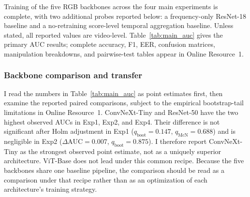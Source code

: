 Training of the five RGB backbones across the four main experiments is complete, with two additional probes reported below: a frequency-only ResNet-18 baseline and a no-retraining score-level temporal aggregation baseline. Unless stated, all reported values are video-level. Table~\ref{tab:main_auc} gives the primary AUC results; complete accuracy, F1, EER, confusion matrices, manipulation breakdowns, and pairwise-test tables appear in Online Resource~1.

\begin{table}[!t]
\caption{Video-level AUC with 95\% bootstrap confidence intervals. Bold marks the highest point estimate in each experiment; it does not imply statistically significant superiority.}
\label{tab:main_auc}
\centering
\scriptsize
\setlength{\tabcolsep}{2pt}
\end{table}

\subsubsection{Backbone comparison and transfer}
I read the numbers in Table~\ref{tab:main_auc} as point estimates first, then examine the reported paired comparisons, subject to the empirical bootstrap-tail limitations in Online Resource~1. ConvNeXt-Tiny and ResNet-50 have the two highest observed AUCs in Exp1, Exp2, and Exp4. Their difference is not significant after Holm adjustment in Exp1 ($q_{\mathrm{boot}}=0.147$, $q_{\mathrm{McN}}=0.688$) and is negligible in Exp2 ($\Delta\mathrm{AUC}=0.007$, $q_{\mathrm{boot}}=0.875$). I therefore report ConvNeXt-Tiny as the strongest observed point estimate, not as a uniquely superior architecture. ViT-Base does not lead under this common recipe. Because the five backbones share one baseline pipeline, the comparison should be read as a comparison under that recipe rather than as an optimization of each architecture's training strategy.

